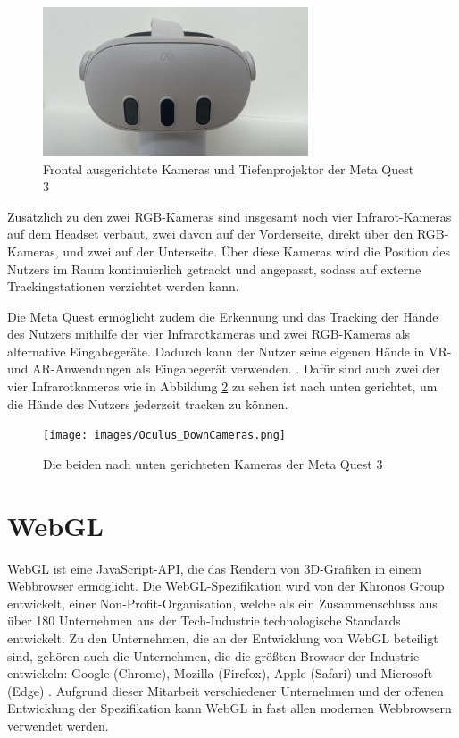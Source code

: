 \begin{figure}[H]
  \centering
  \includegraphics[width=0.7\textwidth]{images/Oculus-FrontCameras.jpg}
  \caption{Frontal ausgerichtete Kameras und Tiefenprojektor der Meta Quest 3}
  \label{fig:quest-front-cameras}
\end{figure}

Zusätzlich zu den zwei RGB-Kameras sind insgesamt noch vier Infrarot-Kameras auf dem Headset verbaut, zwei davon auf der Vorderseite, direkt über den RGB-Kameras, und zwei auf der Unterseite.
Über diese Kameras wird die Position des Nutzers im Raum kontinuierlich getrackt und angepasst, sodass auf externe Trackingstationen verzichtet werden kann.

Die Meta Quest ermöglicht zudem die Erkennung und das Tracking der Hände des Nutzers mithilfe der vier Infrarotkameras und zwei RGB-Kameras als alternative Eingabegeräte.
Dadurch kann der Nutzer seine eigenen Hände in VR- und AR-Anwendungen als Eingabegerät verwenden. \autocite[]{meta-quest-3}.
Dafür sind auch zwei der vier Infrarotkameras wie in Abbildung \ref{fig:quest-hand-cameras} zu sehen ist nach unten gerichtet, um die Hände des Nutzers jederzeit tracken zu können.

\begin{figure}[H]
  \centering
  \texttt{[image: images/Oculus\_DownCameras.png]}
  \caption{Die beiden nach unten gerichteten Kameras der Meta Quest 3}
  \label{fig:quest-hand-cameras}
\end{figure}


\section{WebGL}

WebGL ist eine JavaScript-API, die das Rendern von 3D-Grafiken in einem Webbrowser ermöglicht.
Die WebGL-Spezifikation wird von der Khronos Group entwickelt, einer Non-Profit-Organisation, welche als ein Zusammenschluss aus über 180 Unternehmen aus der Tech-Industrie technologische Standards entwickelt.
Zu den Unternehmen, die an der Entwicklung von WebGL beteiligt sind, gehören auch die Unternehmen, die die größten Browser der Industrie entwickeln: Google (Chrome), Mozilla (Firefox), Apple (Safari) und Microsoft (Edge) \autocite[]{khronos-webgl, khronos-about}.
Aufgrund dieser Mitarbeit verschiedener Unternehmen und der offenen Entwicklung der Spezifikation kann WebGL in fast allen modernen Webbrowsern verwendet werden.

